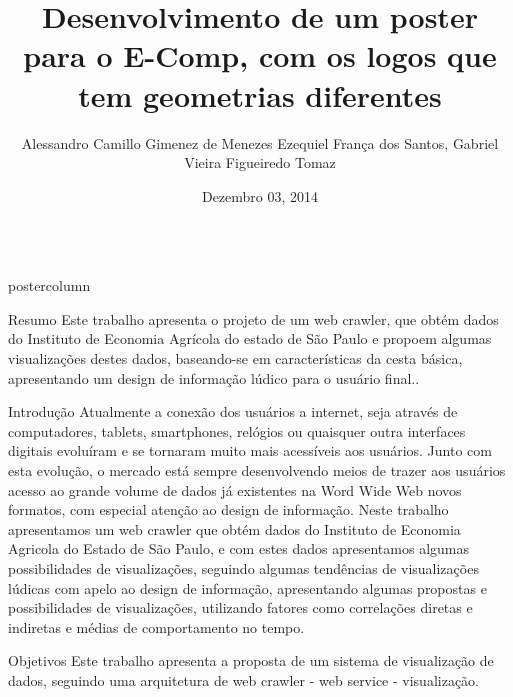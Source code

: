 \documentclass[final,hyperref={pdfpagelabels=false}]{beamer}
\title{\huge Desenvolvimento de um poster para o E-Comp, com os logos que tem geometrias diferentes}
\author{Alessandro Camillo Gimenez de Menezes\inst{1} Ezequiel França dos Santos\inst{1}, Gabriel Vieira Figueiredo Tomaz\inst{1}}
\institute[SENAC]{Centro Universitário Senac - Campus Santo Amaro}
\date[Dezembro 3th, 2014]{Dezembro 03, 2014}
\newlength{\columnheight}
\begin{document}
\begin{frame}
  \begin{columns}%
\begin{column}{.49\textwidth}
      \begin{beamercolorbox}[center,wd=\textwidth]{postercolumn}
        \begin{minipage}[T]{.95\textwidth} %
          \parbox[t][\columnheight]{\textwidth}{ %
            
            \begin{block}{Resumo}
                 Este trabalho apresenta o projeto de um web crawler, que obtém dados do Instituto de Economia Agrícola do estado de São Paulo e propoem algumas visualizações destes dados, baseando-se em características da cesta básica, apresentando um design de informação lúdico para o usuário final..
            \end{block}
            \vfill
            \begin{block}{Introdução}
             Atualmente a conexão dos usuários a internet, seja através de computadores, tablets, smartphones, relógios ou quaisquer outra interfaces digitais evoluíram e se tornaram muito mais acessíveis aos usuários. Junto com esta evolução, o mercado está sempre desenvolvendo meios de trazer aos usuários acesso ao grande volume de dados já existentes na Word Wide Web novos formatos, com especial atenção ao design de informação. Neste trabalho apresentamos um web crawler que obtém dados do Instituto de Economia Agricola do Estado de São Paulo, e com estes dados apresentamos algumas possibilidades de visualizações, seguindo algumas tendências de visualizações lúdicas com apelo ao design de informação, apresentando algumas propostas e possibilidades de visualizações, utilizando fatores como correlações diretas e indiretas e médias de comportamento no tempo.              
            \end{block}
            \vfill
            \begin{block}{Objetivos}
             Este trabalho apresenta a proposta de um sistema de visualização de dados, seguindo uma arquitetura de web crawler - web service - visualização. 
             

\end{block}}
\end{minipage}
\end{beamercolorbox}
\end{column}
\end{columns}
\end{frame}
\end{document}
